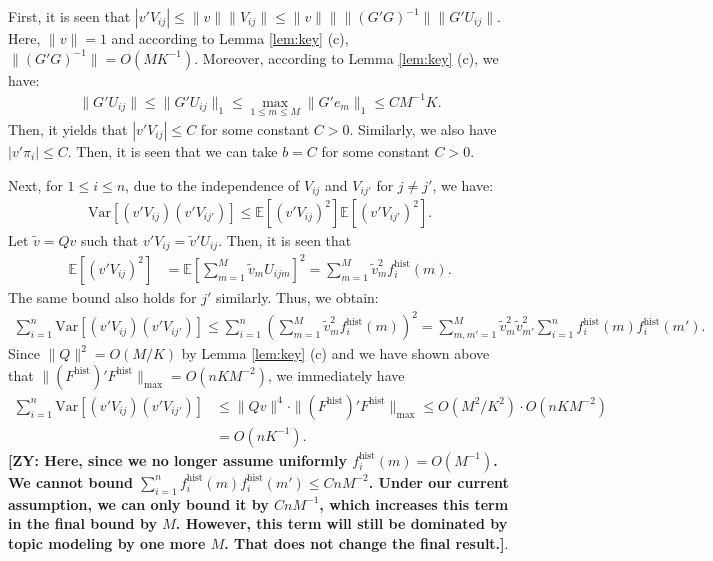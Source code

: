 \documentclass[preprint,11pt]{article}
\newcommand{\mbb}{\mathbb}
\newcommand{\Var}{\text{Var}}
\newcommand{\zy}[1]{{\color{red}\bf[ZY: #1]}}
\numberwithin{equation}{section}
\begin{document}
First, it is seen that $|v'V_{ij}|\le \|v\|\|V_{ij}\|\le \|v\|\|\|(G'G)^{-1}\|\|G'U_{ij}\|$. Here, $\|v\|=1$ and according to Lemma \ref{lem:key} (c), $\|(G'G)^{-1}\| = O(MK^{-1})$. Moreover, according to Lemma \ref{lem:key} (c), we have: 
\begin{align*}
    \|G'U_{ij}\|\le \|G'U_{ij}\|_1\le \max_{1\le m\le M}\|G'e_m\|_1\le CM^{-1}K.
\end{align*}
Then, it yields that $|v'V_{ij}|\le C $ for some constant $C>0$. Similarly, we also have $|v'\pi_{i}|\le C$. Then, it is seen that we can take $b=C$ for some constant $C>0$.

Next, for $1\le i\le n$, due to the independence of $V_{ij}$ and $V_{ij'}$ for $j\ne j'$, we have:
\begin{align*}
    \Var\left[(v'V_{ij})(v'V_{ij'})\right]\le \mbb{E}\left[(v'V_{ij})^2\right]\mbb{E}\left[(v'V_{ij'})^2\right].
\end{align*}
Let $\tilde{v}=Qv$ such that $v'V_{ij}=\tilde{v}'U_{ij}$. Then, it is seen that
\begin{align*}
    \mbb{E}\left[(v'V_{ij})^2\right]&=\mbb{E}\left[\sum_{m=1}^M\tilde{v}_mU_{ijm}\right]^2=\sum_{m=1}^M\tilde{v}_{m}^2f_i^{\text{hist}}(m).
\end{align*}
The same bound also holds for $j'$ similarly. Thus, we obtain:
\begin{align*}
    \sum_{i=1}^n\Var\left[(v'V_{ij})(v'V_{ij'})\right]\le \sum_{i=1}^n\left(\sum_{m=1}^M\tilde{v}_{m}^2f_i^{\text{hist}}(m)\right)^2=\sum_{m,m'=1}^M\tilde{v}_{m}^2\tilde{v}_{m'}^2\sum_{i=1}^n f_i^{\text{hist}}(m)f_i^{\text{hist}}(m').
\end{align*}
Since $\|Q\|^2=O(M/K)$ by Lemma \ref{lem:key} (c) and we have shown above that $\|(F^{\text{hist}})'F^{\text{hist}}\|_{\max}=O(nKM^{-2})$, we immediately have 
\begin{align*}
\sum_{i=1}^n\Var\left[(v'V_{ij})(v'V_{ij'})\right]&\leq \|Qv\|^4\cdot \|(F^{\text{hist}})'F^{\text{hist}}\|_{\max}\leq O(M^2/K^2)\cdot O(nKM^{-2}) \\
&= O(nK^{-1}). 
\end{align*}
\iffalse
\zy{Here, since we no longer assume uniformly $f_i^{\text{hist}}(m)=O(M^{-1})$. We cannot bound $\sum_{i=1}^n f_i^{\text{hist}}(m)f_i^{\text{hist}}(m')\le CnM^{-2}$. Under our current assumption, we can only bound it by $CnM^{-1}$, which increases this term in the final bound by $M$. However, this term will still be dominated by topic modeling by one more $M$. That does not change the final result.}. 
\end{document}
